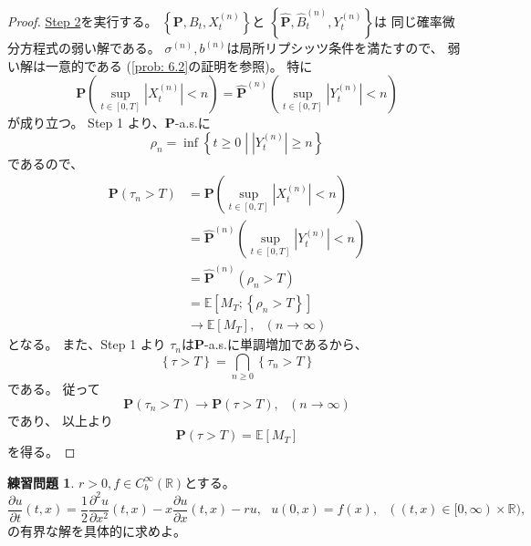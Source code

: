 \documentclass[uplatex]{jsarticle}
\theoremstyle{definition}
\newtheorem{prob}[prob]{練習問題}
\def\R{\mathbb{R}}
\def\P{\mathbf{P}}
\def\E{\mathbb{E}}
\begin{document}
\begin{proof}
  \underline{Step 2}を実行する。
  \(\left\{ \P, B_t,X_t^{(n)}\right\}\)と
  \(\left\{ \hat{\P}, \hat{B}_t^{(n)},Y_t^{(n)}\right\}\)は
  同じ確率微分方程式の弱い解である。
  \(\sigma^{(n)}, b^{(n)}\)は局所リプシッツ条件を満たすので、
  弱い解は一意的である (\autoref{prob: 6.2}の証明を参照)。
  特に
  \[
  \P \left(\sup_{t\in [0,T]}|X_t^{(n)}| < n\right)
  = \hat{\P}^{(n)} \left( \sup_{t\in [0,T]}|Y_t^{(n)}| < n\right)
  \]
  が成り立つ。
  Step 1 より、\(\P\)-a.s.に
  \[
  \rho_n = \inf \left\{ t\geq 0\middle| |Y_t^{(n)}| \geq n \right\}
  \]
  であるので、
  \begin{align*}
    \P(\tau_n > T)
    &= \P \left(\sup_{t\in [0,T]}|X_t^{(n)}| < n\right) \\
    &= \hat{\P}^{(n)} \left( \sup_{t\in [0,T]}|Y_t^{(n)}| < n\right) \\
    &= \hat{\P}^{(n)} (\rho_n > T) \\
    &= \E \left[ M_T ; \left\{ \rho_n > T \right\} \right] \\
    &\to \E\left[ M_T \right] , \ \ \ (n\to \infty)
  \end{align*}
  となる。
  また、Step 1 より
  \(\tau_n\)は\(\P\)-a.s.に単調増加であるから、
  \[
  \left\{ \tau > T\right\}
  = \bigcap_{n\geq 0}\left\{ \tau_n > T\right\}
  \]
  である。
  従って
  \[
  \P(\tau_n > T) \to \P (\tau > T) , \ \ \ (n\to\infty)
  \]
  であり、
  以上より
  \[
  \P (\tau > T) = \E\left[ M_T \right]
  \]
  を得る。
\end{proof}








\begin{prob}\label{prob: 6.5}
  \(r > 0, f\in C^{\infty}_b(\R)\)とする。
  \[
  \frac{\partial u}{\partial t}(t,x) =
  \frac{1}{2}\frac{\partial^2 u}{\partial x^2}(t,x)
  - x \frac{\partial u}{\partial x}(t,x)
  -ru, \ \ \ u(0,x) = f(x), \ \ \ ((t,x)\in [0,\infty)\times \R),
  \]
  の有界な解を具体的に求めよ。
\end{prob}
\end{document}
